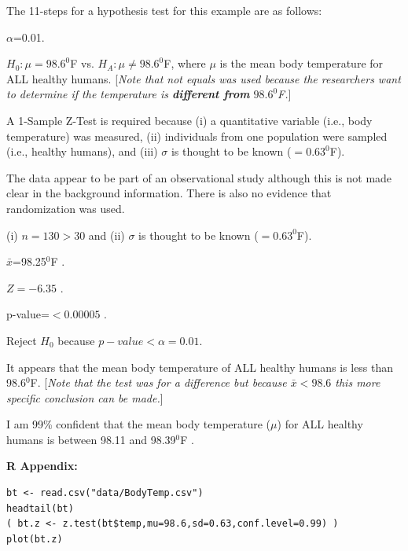 \documentclass[10pt,openany]{book}\usepackage[]{graphicx}\usepackage[]{color}
\makeatletter
\newenvironment{kframe}{%
 \def\at@end@of@kframe{}%
 \ifinner\ifhmode%
  \def\at@end@of@kframe{\end{minipage}}%
  \begin{minipage}{\columnwidth}%
 \fi\fi%
 \def\FrameCommand##1{\hskip\@totalleftmargin \hskip-\fboxsep
 \colorbox{shadecolor}{##1}\hskip-\fboxsep
     \hskip-\linewidth \hskip-\@totalleftmargin \hskip\columnwidth}%
 \MakeFramed {\advance\hsize-\width
   \@totalleftmargin\z@ \linewidth\hsize
   \@setminipage}}%
 {\par\unskip\endMakeFramed%
 \at@end@of@kframe}
\newenvironment{knitrout}{}{} %
\makeatother
\begin{document}
The 11-steps  for a hypothesis test for this example are as follows:
\vspace{-8pt}
\begin{Enumerate}
  \item $\alpha$=0.01.
  \item $H_{0}:\mu=98.6^{0}$F vs. $H_{A}:\mu\neq98.6^{0}$F, where $\mu$ is the mean body temperature for ALL healthy humans. [\textit{Note that not equals was used because the researchers want to determine if the temperature is \textbf{different from} $98.6^{0}$F.}]
  \item A 1-Sample Z-Test is required because (i) a quantitative variable (i.e., body temperature) was measured, (ii) individuals from one population were sampled (i.e., healthy humans), and (iii) $\sigma$ is thought to be known ($=0.63^{0}$F).
  \item The data appear to be part of an observational study although this is not made clear in the background information.  There is also no evidence that randomization was used.
  \item (i) $n=130>30$ and (ii) $\sigma$ is thought to be known ($=0.63^{0}$F).
  \item $\bar{x}$=98.25$^{0}$F .
  \item $Z=-6.35$ .
  \item p-value=$<0.00005$ .
  \item Reject $H_{0}$ because $p-value<\alpha=0.01$.
  \item It appears that the mean body temperature of ALL healthy humans is less than 98.6$^{0}$F. [\textit{Note that the test was for a difference but because $\bar{x}<98.6$ this more specific conclusion can be made.}]
  \item I am 99\% confident that the mean body temperature ($\mu$) for ALL healthy humans is between 98.11 and 98.39$^{0}$F .
\end{Enumerate}

\begin{minipage}{\textwidth}
\textbf{R Appendix:}
\begin{knitrout}
\color{fgcolor}\begin{kframe}
\begin{verbatim}
bt <- read.csv("data/BodyTemp.csv")
headtail(bt)
( bt.z <- z.test(bt$temp,mu=98.6,sd=0.63,conf.level=0.99) )
plot(bt.z)
\end{verbatim}
\end{kframe}
\end{knitrout}
\end{minipage}
\end{document}
